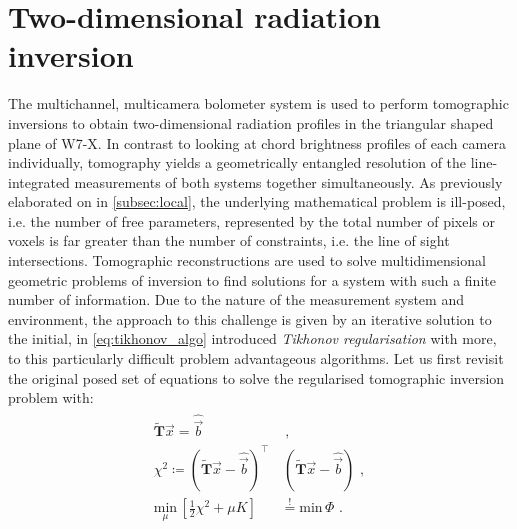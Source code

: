 %
\chapter{Two-dimensional radiation inversion}\label{chap:inversions}%
%
    The multichannel, multicamera bolometer system is used to perform tomographic inversions to obtain two-dimensional radiation profiles in the triangular shaped plane of W7-X. In contrast to looking at chord brightness profiles of each camera individually, tomography yields a geometrically entangled resolution of the line-integrated measurements of both systems together simultaneously. As previously elaborated on in \cref{subsec:local}, the underlying mathematical problem is ill-posed, i.e. the number of free parameters, represented by the total number of pixels or voxels is far greater than the number of constraints, i.e. the line of sight intersections. Tomographic reconstructions are used to solve multidimensional geometric problems of inversion to find solutions for a system with such a finite number of information. Due to the nature of the measurement system and environment, the approach to this challenge is given by an iterative solution to the initial, in \cref{eq:tikhonov_algo} introduced \textit{Tikhonov regularisation} with more, to this particularly difficult problem advantageous algorithms. Let us first revisit the original posed set of equations to solve the regularised tomographic inversion problem with:
%
    \begin{align}%
        \begin{split}\label{eq:minfisher_base}%
            \mathbf{\widetilde{T}}\vec{x}=\mathrel{\hat{\vec{b}}}&\,\,,\\%
            \chi^{2}\coloneqq\left(\mathbf{\widetilde{T}}\vec{x}-\mathrel{\hat{\vec{b}}}\right)^{\intercal}&\,\left(\mathbf{\widetilde{T}}\vec{x}-\mathrel{\hat{\vec{b}}}\right)\,\,,\\%
            \underset{\mu}{\text{min}}\,\left[\frac{1}{2}\chi^{2}+\mu K\right]&\overset{!}{=}\text{min}\,\Phi\,\,.%
        \end{split}%
    \end{align}%
%
